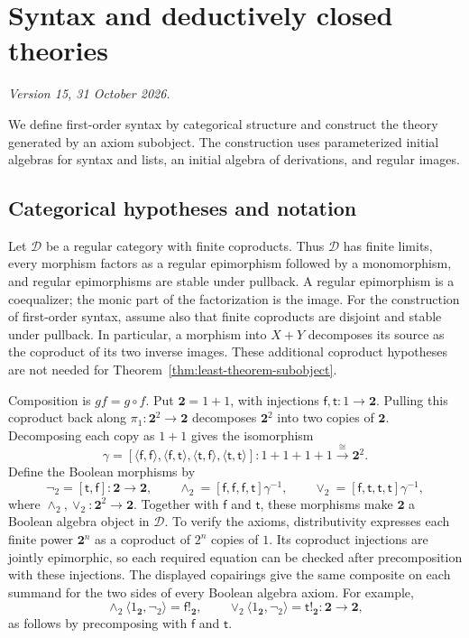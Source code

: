 \documentclass[11pt]{article}
\theoremstyle{definition}\newtheorem{definition}[theorem]{Definition}
\newcommand{\Two}{\mathbf 2}
\begin{document}
\appendix
\section{Syntax and deductively closed theories}
\label{app:syntax-theories}
\noindent\textit{Version 15, 31 October 2026.}\par\medskip

We define first-order syntax by categorical structure and construct
the theory generated by an axiom subobject. The construction uses
parameterized initial algebras for syntax and lists, an initial algebra
of derivations, and regular images.

\subsection{Categorical hypotheses and notation}
\label{app:categorical-hypotheses}

Let $\mathcal D$ be a regular category with finite coproducts.
Thus $\mathcal D$ has finite limits, every morphism factors as a
regular epimorphism followed by a monomorphism, and regular
epimorphisms are stable under pullback. A regular epimorphism is a
coequalizer; the monic part of the factorization is the image.
For the construction of first-order syntax, assume also that finite
coproducts are disjoint and stable under pullback. In particular,
a morphism into $X+Y$ decomposes its source as the coproduct of its
two inverse images. These additional coproduct hypotheses are not
needed for Theorem~\ref{thm:least-theorem-subobject}.

Composition is $gf=g\circ f$. Put $\Two=1+1$, with injections
$\mathsf f,\mathsf t:1\to\Two$. Pulling this coproduct back along
$\pi_1:\Two^2\to\Two$ decomposes $\Two^2$ into two copies of
$\Two$. Decomposing each copy as $1+1$ gives the isomorphism
\[
 \gamma=[\langle\mathsf f,\mathsf f\rangle,
          \langle\mathsf f,\mathsf t\rangle,
          \langle\mathsf t,\mathsf f\rangle,
          \langle\mathsf t,\mathsf t\rangle]:
          1+1+1+1\xrightarrow{\cong}\Two^2.
\]
Define the Boolean morphisms by
\[
 \neg_2=[\mathsf t,\mathsf f]:\Two\to\Two,\qquad
 \wedge_2=[\mathsf f,\mathsf f,\mathsf f,\mathsf t]\gamma^{-1},
 \qquad
 \vee_2=[\mathsf f,\mathsf t,\mathsf t,\mathsf t]\gamma^{-1},
\]
where $\wedge_2,\vee_2:\Two^2\to\Two$.
Together with $\mathsf f$ and $\mathsf t$, these morphisms make
$\Two$ a Boolean algebra object in $\mathcal D$.
To verify the axioms, distributivity expresses each finite power
$\Two^n$ as a coproduct of $2^n$ copies of $1$.
Its coproduct injections are jointly epimorphic, so each required
equation can be checked after precomposition with these injections.
The displayed copairings give the same composite on each summand
for the two sides of every Boolean algebra axiom. For example,
\[
 \wedge_2\langle1_{\Two},\neg_2\rangle=\mathsf f!_{\Two},
 \qquad
 \vee_2\langle1_{\Two},\neg_2\rangle=\mathsf t!_{\Two}:
 \Two\to\Two,
\]
as follows by precomposing with $\mathsf f$ and $\mathsf t$.
\end{document}
